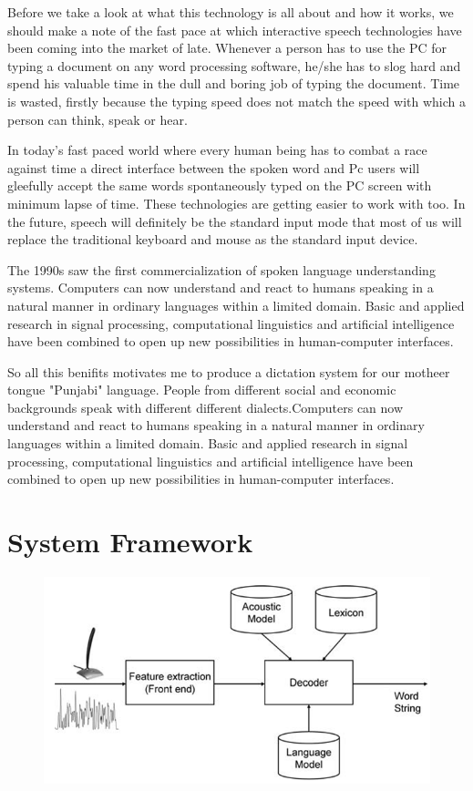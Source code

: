 \documentclass[12pt,a4paper,oldfontcommands]{memoir}
\begin{document}
Before we take a look at what this technology is all about and how it works, we
should make a note of the fast pace at which interactive speech technologies have
been coming into the market of late. Whenever a person has to use the PC for typing a
document on any word processing software, he/she has to slog hard and spend his
valuable time in the dull and boring job of typing the document. Time is wasted,
firstly because the typing speed does not match the speed with which a person can
think, speak or hear.

In today’s fast paced
world where every human being has to combat a race against time a direct interface
between the spoken word and Pc users will gleefully accept the same words
spontaneously typed on the PC screen with minimum lapse of time. These
technologies are getting easier to work with too. In the future, speech will definitely
be the standard input mode that most of us will replace the traditional keyboard and
mouse as the standard input device\cite{19}.

The 1990s saw the first commercialization of spoken language understanding
systems. Computers can now understand and react to humans speaking in a natural
manner in ordinary languages within a limited domain. Basic and applied research in
signal processing, computational linguistics and artificial intelligence have been
combined to open up new possibilities in human-computer interfaces\cite{21}.

So all this benifits motivates me to produce a dictation system for our motheer tongue "Punjabi" language. People from different social and economic backgrounds speak with different different dialects.Computers can now understand and react to humans speaking in a natural
manner in ordinary languages within a limited domain. Basic and applied research in
signal processing, computational linguistics and artificial intelligence have been
combined to open up new possibilities in human-computer interfaces.

\newpage

\section{System Framework}

\begin{figure}[h]
    \centering
    \includegraphics[scale=0.5]{tmp725d99_thumb}
\end{figure}
\end{document}
